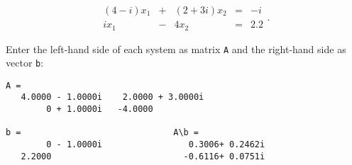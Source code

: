 \documentclass{ximera}
\begin{document}
\begin{computerExercise} \label{c2.5.2b}
\[
\begin{array}{rcrcr}
(4-i)x_1 & + & (2+3i)x_2 & = &  -i \\
   i x_1 & - &     4 x_2 & = & 2.2
\end{array}.
\]

\begin{solution}

Enter the left-hand side of each system as matrix {\tt A} 
and the right-hand side as vector {\tt b}:

\begin{verbatim}
A =
   4.0000 - 1.0000i    2.0000 + 3.0000i
        0 + 1.0000i   -4.0000          

b =                              A\b =
        0 - 1.0000i                 0.3006+ 0.2462i
   2.2000                          -0.6116+ 0.0751i
\end{verbatim}

\end{solution}
\end{computerExercise}
\end{document}
